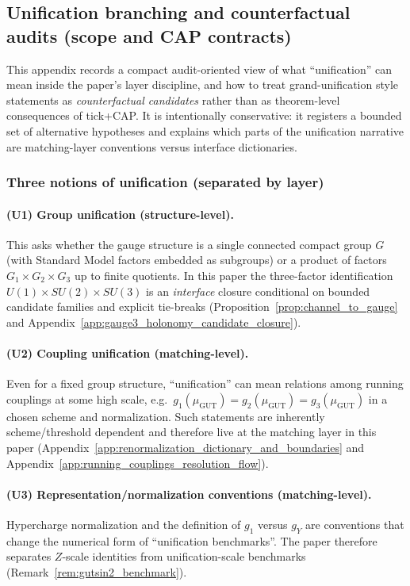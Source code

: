 \subsection{Unification branching and counterfactual audits (scope and CAP contracts)}
\label{app:unification_branching_counterfactual_audit}

This appendix records a compact audit-oriented view of what ``unification'' can mean inside the paper's layer discipline, and how to treat grand-unification style statements as \emph{counterfactual candidates} rather than as theorem-level consequences of tick+CAP.
It is intentionally conservative: it registers a bounded set of alternative hypotheses and explains which parts of the unification narrative are matching-layer conventions versus interface dictionaries.

\subsubsection{Three notions of unification (separated by layer)}
\paragraph{(U1) Group unification (structure-level).}
\InterfaceTag This asks whether the gauge structure is a single connected compact group $G$ (with Standard Model factors embedded as subgroups) or a product of factors $G_1\times G_2\times G_3$ up to finite quotients.
In this paper the three-factor identification $U(1)\times SU(2)\times SU(3)$ is an \emph{interface} closure conditional on bounded candidate families and explicit tie-breaks (Proposition~\ref{prop:channel_to_gauge} and Appendix~\ref{app:gauge3_holonomy_candidate_closure}).

\paragraph{(U2) Coupling unification (matching-level).}
\MatchTag Even for a fixed group structure, ``unification'' can mean relations among running couplings at some high scale, e.g.\ $g_1(\mu_{\mathrm{GUT}})=g_2(\mu_{\mathrm{GUT}})=g_3(\mu_{\mathrm{GUT}})$ in a chosen scheme and normalization.
Such statements are inherently scheme/threshold dependent and therefore live at the matching layer in this paper (Appendix~\ref{app:renormalization_dictionary_and_boundaries} and Appendix~\ref{app:running_couplings_resolution_flow}).

\paragraph{(U3) Representation/normalization conventions (matching-level).}
\MatchTag Hypercharge normalization and the definition of $g_1$ versus $g_Y$ are conventions that change the numerical form of ``unification benchmarks''.
The paper therefore separates $Z$-scale identities from unification-scale benchmarks (Remark~\ref{rem:gutsin2_benchmark}).

